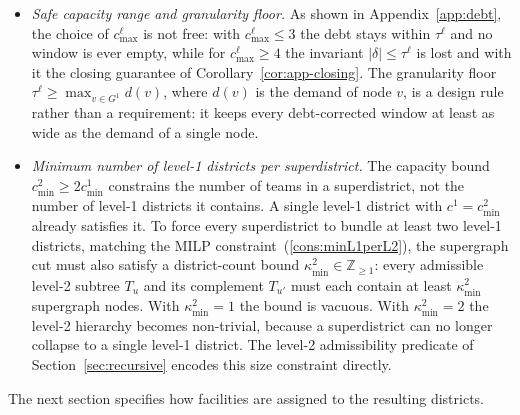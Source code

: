 \documentclass[preprint,12pt,authoryear]{elsarticle}
\theoremstyle{definition}
\begin{document}
\begin{itemize}
        \item \emph{Safe capacity range and granularity floor.} As shown in Appendix~\ref{app:debt}, the choice of $c^{\ell}_{\max}$ is not free: with $c^{\ell}_{\max} \leq 3$ the debt stays within $\tau^{\ell}$ and no window is ever empty, while for $c^{\ell}_{\max} \geq 4$ the invariant $|\delta| \leq \tau^{\ell}$ is lost and with it the closing guarantee of Corollary~\ref{cor:app-closing}. The granularity floor $\tau^{\ell} \geq \max_{v \in G^1} d(v)$, where $d(v)$ is the demand of node $v$, is a design rule rather than a requirement: it keeps every debt-corrected window at least as wide as the demand of a single node.
    
    \item \emph{Minimum number of level-1 districts per superdistrict.}
    The capacity bound $c^2_{\min} \geq 2 c^1_{\min}$ constrains the number of teams in a superdistrict, not the number of level-1 districts it contains. A single level-1 district with $c^1 = c^2_{\min}$ already satisfies it. To force every
    superdistrict to bundle at least two level-1 districts, matching
    the MILP constraint~(\ref{cons:minL1perL2}), the supergraph cut
    must also satisfy a district-count bound
    $\kappa^2_{\min} \in \mathbb{Z}_{\geq 1}$: every admissible
    level-2 subtree $T_u$ and its complement $T_{u'}$ must each
    contain at least $\kappa^2_{\min}$ supergraph nodes. With $\kappa^2_{\min} = 1$ the bound is vacuous. With $\kappa^2_{\min} = 2$ the level-2 hierarchy becomes non-trivial, because a superdistrict can no longer collapse to a single level-1 district. The level-2 admissibility predicate
    of Section~\ref{sec:recursive} encodes this size constraint
    directly.
    
    \end{itemize}


The next section specifies how facilities are assigned to the resulting districts.

\end{document}
